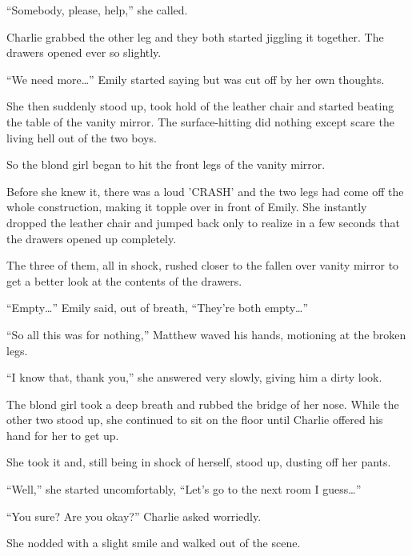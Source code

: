 “Somebody, please, help,” she called.

Charlie grabbed the other leg and they both started jiggling it together. The drawers opened ever so slightly.

“We need more…” Emily started saying but was cut off by her own thoughts.

She then suddenly stood up, took hold of the leather chair and started beating the table of the vanity mirror. The surface-hitting did nothing except scare the living hell out of the two boys.

So the blond girl began to hit the front legs of the vanity mirror.

Before she knew it, there was a loud 'CRASH' and the two legs had come off the whole construction, making it topple over in front of Emily. She instantly dropped the leather chair and jumped back only to realize in a few seconds that the drawers opened up completely.

The three of them, all in shock, rushed closer to the fallen over vanity mirror to get a better look at the contents of the drawers.

“Empty…” Emily said, out of breath, “They're both empty…”

“So all this was for nothing,” Matthew waved his hands, motioning at the broken legs.

“I know that, thank you,” she answered very slowly, giving him a dirty look.

The blond girl took a deep breath and rubbed the bridge of her nose. While the other two stood up, she continued to sit on the floor until Charlie offered his hand for her to get up.

She took it and, still being in shock of herself, stood up, dusting off her pants.

“Well,” she started uncomfortably, “Let's go to the next room I guess…”

“You sure? Are you okay?” Charlie asked worriedly.

She nodded with a slight smile and walked out of the scene.
